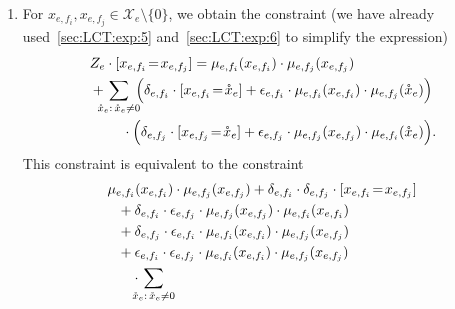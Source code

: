 \documentclass[journal]{IEEEtran}
\newcommand{\set}[1]{\mathcal{#1}}
\newcommand{\LCT}[1]{ \mathring{#1} }
\newcommand{\efi}{ e,f_i }
\newcommand{\efj}{ e,f_j }
\begin{document}
\begin{appendices}
\begin{enumerate}
    \item For $x_{\efi}, x_{\efj} \in \set{X}_e \setminus \{ 0 \}$, we obtain the
          constraint (we have already used~\eqref{sec:LCT:exp:5}
          and~\eqref{sec:LCT:exp:6} to simplify the expression)
          \begin{align*}
             & Z_e
            \cdot
            [x_{\efi} \!=\! x_{\efj}]= \mu_{\efi}(x_{\efi})
            \cdot
            \mu_{\efj}(x_{\efj})
            \\&+
            \!\! \!\!\sum_{\LCT{x}_e: \, \LCT{x}_e \neq 0} \!\!
            \Bigl(
            \delta_{\efi}
            \cdot
            [x_{\efi} \!=\! \LCT{x}_e]
            +
            \epsilon_{\efi}
            \cdot
            \mu_{\efi}(x_{\efi})
            \cdot
            \mu_{\efj}(\LCT{x}_e)
            \Bigr) \\
             &
            \qquad\,\,\cdot
            \Bigl(
            \delta_{\efj}
            \cdot
            [x_{\efj} \!=\! \LCT{x}_e]
            +
            \epsilon_{\efj}
            \cdot
            \mu_{\efj}(x_{\efj})
            \cdot
            \mu_{\efi}(\LCT{x}_e)
            \Bigr).
          \end{align*}
          This constraint is equivalent to the constraint
          \begin{align*}
            \hspace{0.25cm} & \hspace{-0.25cm}
            \mu_{\efi}(x_{\efi})
            \cdot
            \mu_{\efj}(x_{\efj})
            +
            \delta_{\efi}
            \cdot
            \delta_{\efj}
            \cdot
            [x_{\efi} \!=\! x_{\efj}]          \\
                            &
            +
            \delta_{\efi}
            \cdot
            \epsilon_{\efj}
            \cdot
            \mu_{\efj}(x_{\efj})
            \cdot
            \mu_{\efi}(x_{\efi})
            \\
                            &
            +
            \delta_{\efj}
            \cdot
            \epsilon_{\efi}
            \cdot
            \mu_{\efi}(x_{\efi})
            \cdot
            \mu_{\efj}(x_{\efj})               \\
                            &
            +
            \epsilon_{\efi}
            \cdot
            \epsilon_{\efj}
            \cdot
            \mu_{\efi}(x_{\efi})
            \cdot
            \mu_{\efj}(x_{\efj})
            \\&\quad\cdot \!\!\!\!\sum_{\LCT{x}_e: \, \LCT{x}_e \neq 0}\!\!\!\!

\end{align*}
\end{enumerate}
\end{appendices}
\end{document}

